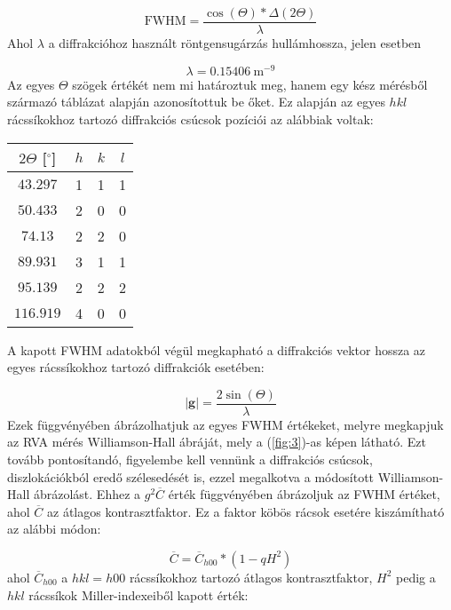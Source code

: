 \begin{multicols}{2}
\begin{equation}
\text{FWHM}
=
\frac{\cos \left( \Theta \right) * \Delta \left( 2 \Theta \right)}{\lambda} 
\end{equation}
Ahol $\lambda$ a diffrakcióhoz használt röntgensugárzás hullámhossza, jelen esetben

\begin{equation*}
\lambda
=
0.15406\ \text{m}^{-9}
\end{equation*}
Az egyes $\Theta$ szögek értékét nem mi határoztuk meg, hanem egy kész mérésből származó táblázat alapján azonosítottuk be őket. Ez alapján az egyes $hkl$ rácssíkokhoz tartozó diffrakciós csúcsok pozíciói az alábbiak voltak:

\begin{center}
\begin{tabular}{|c|c|c|c|}
\hline
$2 \Theta$ [$^{\circ}$] & $h$ & $k$ & $l$ \\ \hline\hline
$43.297$                & 1   & 1   & 1 \\
$50.433$                & 2   & 0   & 0 \\
$74.13$                 & 2   & 2   & 0 \\
$89.931$                & 3   & 1   & 1 \\
$95.139$                & 2   & 2   & 2 \\
$116.919$               & 4   & 0   & 0 \\ \hline
\end{tabular}
\end{center}
A kapott FWHM adatokból végül megkapható a diffrakciós vektor hossza az egyes rácssíkokhoz tartozó diffrakciók esetében:

\begin{equation}
\left| \boldsymbol{g} \right|
=
\frac{2 \sin \left( \Theta \right)}{\lambda}
\end{equation}
Ezek függvényében ábrázolhatjuk az egyes FWHM értékeket, melyre megkapjuk az RVA mérés Williamson-Hall ábráját, mely a (\ref{fig:3})-as képen látható. Ezt tovább pontosítandó, figyelembe kell vennünk a diffrakciós csúcsok, diszlokációkból eredő szélesedését is, ezzel megalkotva a módosított Williamson-Hall ábrázolást. Ehhez a $g^{2} \overline{C}$ érték függvényében ábrázoljuk az FWHM értéket, ahol $\overline{C}$ az átlagos kontrasztfaktor. Ez a faktor köbös rácsok esetére kiszámítható az alábbi módon:

\begin{equation}
\overline{C}
=
\overline{C}_{h00} * \left( 1 - qH^{2} \right)
\end{equation}
ahol $\overline{C}_{h00}$ a $hkl = h00$ rácssíkokhoz tartozó átlagos kontrasztfaktor, $H^{2}$ pedig a $hkl$ rácssíkok Miller-indexeiből kapott érték:


\end{multicols}

